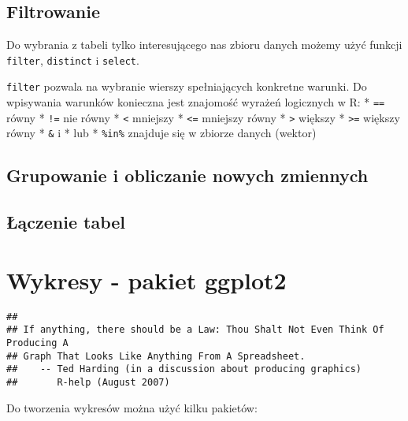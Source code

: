 \documentclass[
]{book}
\begin{document}
\hypertarget{filtrowanie}{%
\section{Filtrowanie}\label{filtrowanie}}

Do wybrania z tabeli tylko interesującego nas zbioru danych możemy użyć funkcji \texttt{filter}, \texttt{distinct} i \texttt{select}.

\texttt{filter} pozwala na wybranie wierszy spełniających konkretne warunki. Do wpisywania warunków konieczna jest znajomość wyrażeń logicznych w R:
* \texttt{==} równy
* \texttt{!=} nie równy
* \texttt{\textless{}} mniejszy
* \texttt{\textless{}=} mniejszy równy
* \texttt{\textgreater{}} większy
* \texttt{\textgreater{}=} większy równy
* \texttt{\&} i
* \texttt{\textbar{}} lub
* \texttt{\%in\%} znajduje się w zbiorze danych (wektor)

\hypertarget{grupowanie-i-obliczanie-nowych-zmiennych}{%
\section{Grupowanie i obliczanie nowych zmiennych}\label{grupowanie-i-obliczanie-nowych-zmiennych}}

\hypertarget{ux142ux105czenie-tabel}{%
\section{Łączenie tabel}\label{ux142ux105czenie-tabel}}

\hypertarget{wykresy---pakiet-ggplot2}{%
\chapter{Wykresy - pakiet ggplot2}\label{wykresy---pakiet-ggplot2}}

\begin{verbatim}
## 
## If anything, there should be a Law: Thou Shalt Not Even Think Of Producing A
## Graph That Looks Like Anything From A Spreadsheet.
##    -- Ted Harding (in a discussion about producing graphics)
##       R-help (August 2007)
\end{verbatim}

Do tworzenia wykresów można użyć kilku pakietów:
\end{document}
